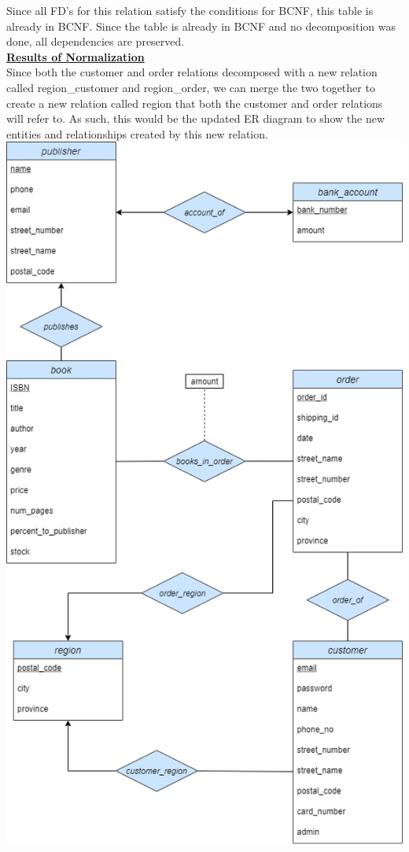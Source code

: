 \documentclass[a4 paper]{article}
\begin{document}
\noindent Since all FD's for this relation satisfy the conditions for BCNF, this table is already in BCNF. Since the table is already in BCNF and no decomposition was done, all dependencies are preserved.\\

\noindent\underline{\textbf{Results of Normalization}}\\
Since both the customer and order relations decomposed with a new relation called region\_customer and region\_order, we can merge the two together to create a new relation called region that both the customer and order relations will refer to. As such, this would be the updated ER diagram to show the new entities and relationships created by this new relation.\\

\includegraphics[scale=0.4]{../Diagrams/ER-diagram-bookstore-comp3005-finalproject-after-normalization.drawio.png}\\
\end{document}
